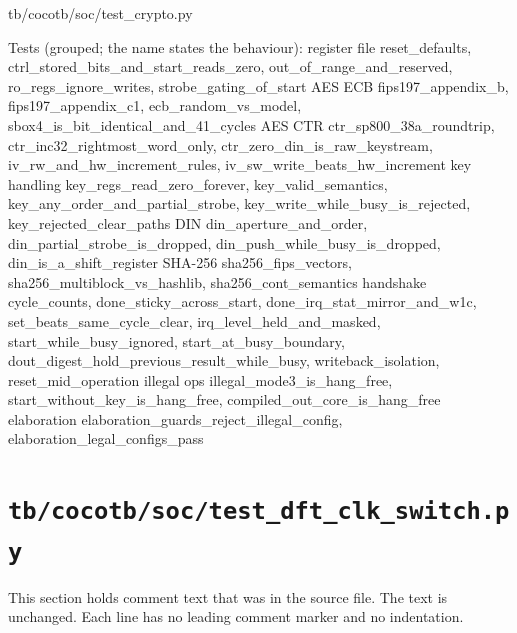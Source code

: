 \begin{relocated}{tb/cocotb/soc/test_crypto.py}
\begin{textblock}
Tests (grouped; the name states the behaviour):
register file   reset_defaults, ctrl_stored_bits_and_start_reads_zero, out_of_range_and_reserved,
ro_regs_ignore_writes, strobe_gating_of_start
AES ECB         fips197_appendix_b, fips197_appendix_c1, ecb_random_vs_model,
sbox4_is_bit_identical_and_41_cycles
AES CTR         ctr_sp800_38a_roundtrip, ctr_inc32_rightmost_word_only,
ctr_zero_din_is_raw_keystream, iv_rw_and_hw_increment_rules,
iv_sw_write_beats_hw_increment
key handling    key_regs_read_zero_forever, key_valid_semantics, key_any_order_and_partial_strobe,
key_write_while_busy_is_rejected, key_rejected_clear_paths
DIN             din_aperture_and_order, din_partial_strobe_is_dropped,
din_push_while_busy_is_dropped, din_is_a_shift_register
SHA-256         sha256_fips_vectors, sha256_multiblock_vs_hashlib, sha256_cont_semantics
handshake       cycle_counts, done_sticky_across_start, done_irq_stat_mirror_and_w1c,
set_beats_same_cycle_clear, irq_level_held_and_masked,
start_while_busy_ignored, start_at_busy_boundary,
dout_digest_hold_previous_result_while_busy, writeback_isolation,
reset_mid_operation
illegal ops     illegal_mode3_is_hang_free, start_without_key_is_hang_free,
compiled_out_core_is_hang_free
elaboration     elaboration_guards_reject_illegal_config, elaboration_legal_configs_pass
\end{textblock}

\end{relocated}

\section{\texttt{tb/cocotb/soc/test\_dft\_clk\_switch.py}}\label{tm:suite:soc-test-dft-clk-switch}

This section holds comment text that was in the source file. The text is unchanged. Each line has no leading comment marker and no indentation.

